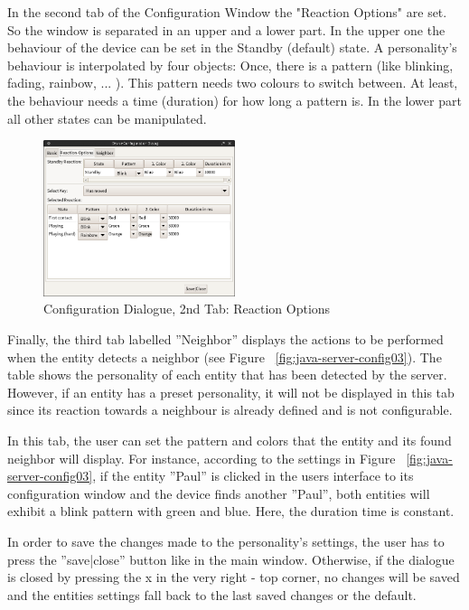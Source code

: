 In the second tab of the Configuration Window the "Reaction Options" are set.
So the window is separated in an upper and a lower part. In the upper one the behaviour of the device can be set in the Standby (default) state. A personality's behaviour is interpolated by four objects: Once, there is a pattern (like blinking, fading, rainbow, ... ). This pattern needs two colours to switch between. At least, the behaviour needs a time (duration) for how long a pattern is.
In the lower part all other states can be manipulated.   


\begin{figure}[h!]
 \centering
 \includegraphics[width= 0.5\textwidth, clip=true  ,keepaspectratio=true]{./pic/java-server-config02.png}
 \caption{Configuration Dialogue, 2nd Tab: Reaction Options}
 \label{fig:java-server-config02}
\end{figure}


Finally, the third tab labelled ''Neighbor'' displays the actions to be performed when the entity detects a neighbor (see Figure ~\ref{fig:java-server-config03}). The table shows the personality of each entity that has been detected by the server. However, if an entity has a preset personality, it will not be displayed in this tab since its reaction towards a neighbour is already defined and is not configurable. 

In this tab, the user can set the pattern and colors that the entity and its found neighbor will display. For instance, according to the settings in Figure ~\ref{fig:java-server-config03}, if the entity ''Paul'' is clicked in the users interface to its configuration window and the device finds another ''Paul'', both entities will exhibit a blink pattern with green and blue. Here, the duration time is constant.

In order to save the changes made to the personality's settings, the user has to press the ''save|close'' button like in the main window. Otherwise, if the dialogue is closed by pressing the x in the very right - top corner, no changes will be saved and the entities settings fall back to the last saved changes or the default. 

